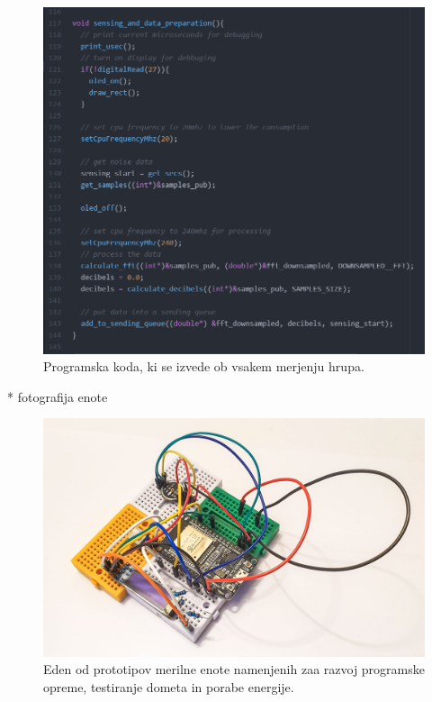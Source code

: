 \documentclass[a4paper, 12pt]{book}
\begin{document}
\begin{figure}[H]
    \centering
    \includegraphics[width=\linewidth]{slikovno_gradivo/koda_podatki.png}
    \caption{Programska koda, ki se izvede ob vsakem merjenju hrupa.}
    \label{fig:koda_podatki}
\end{figure}
* fotografija enote

\begin{figure}[H]
    \centering
    \includegraphics[width=\linewidth]{slikovno_gradivo/prototip_1.jpg}
    \caption{Eden od prototipov merilne enote namenjenih zaa razvoj programske opreme, testiranje dometa in porabe energije.}
    \label{fig:prototip}
\end{figure}
\end{document}
